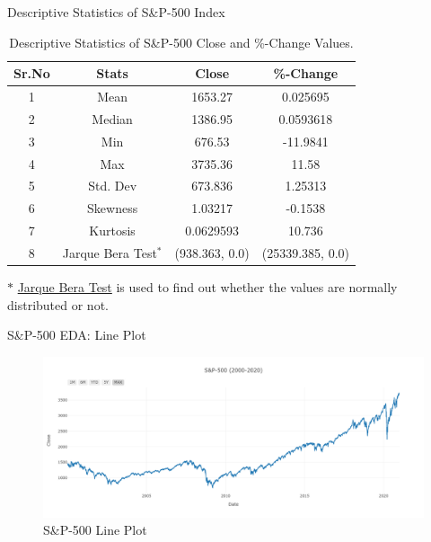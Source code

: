 \documentclass{beamer}
\begin{document}
\begin{frame}{Descriptive Statistics of S\&P-500 Index}
	\begin{table}[htbp]
		\centering
		\begin{tabular}{c c c c}
			\textbf{Sr.No} & \textbf{Stats}         & \textbf{Close} & \textbf{\%-Change} \\
			\toprule
			1              & Mean                   & 1653.27        & 0.025695           \\
			2              & Median                 & 1386.95        & 0.0593618          \\
			3              & Min                    & 676.53         & -11.9841           \\
			4              & Max                    & 3735.36        & 11.58              \\
			5              & Std. Dev               & 673.836        & 1.25313            \\
			6              & Skewness               & 1.03217        & -0.1538            \\
			7              & Kurtosis               & 0.0629593      & 10.736             \\
			8              & Jarque Bera Test$^{*}$ & (938.363, 0.0) & (25339.385, 0.0)   \\
			\bottomrule
		\end{tabular}
		\caption{Descriptive Statistics of S\&P-500 Close and \%-Change Values.}
		\label{tab:my_label}
	\end{table}
	$*$ \href{https://cutt.ly/5nwffCF}{Jarque Bera Test} is used to find out whether the values are normally distributed or not.
\end{frame}

\begin{frame}{S\&P-500 EDA: Line Plot}
	\begin{figure}
		\centering
		\includegraphics[width = \textwidth]{images/S&P-500 Line-Plot-1}
		\caption{S\&P-500 Line Plot}
		\label{fig:my_label}
	\end{figure}
\end{frame}
\end{document}
